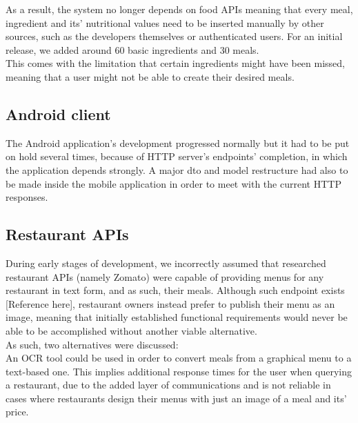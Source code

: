     As a result, the system no longer depends on food APIs meaning that every meal, ingredient and its' nutritional values
    need to be inserted manually by other sources, such as the developers themselves or authenticated users.
    For an initial release, we added around 60 basic ingredients and 30 meals.\\
    
    This comes with the limitation that certain ingredients might have been missed,
    meaning that a user might not be able to create their desired meals.

    \subsection{Android client}

    The Android application's development progressed normally but it had to be put on hold several times, because of HTTP server's endpoints' completion, in which the application
    depends strongly. A major dto and model restructure had also to be made inside the mobile application in order to meet with the current HTTP responses.\\

    \subsection{Restaurant APIs}

    During early stages of development, 
    we incorrectly assumed that researched restaurant APIs (namely Zomato) were capable 
    of providing menus for any restaurant in text form, and as such, their meals. Although such endpoint exists [Reference here], 
    restaurant owners instead prefer to publish their menu as an image, 
    meaning that initially established functional requirements would never be able to be accomplished without 
    another viable alternative.\\

    As such, two alternatives were discussed:\\

    An OCR tool could be used in order to convert meals from a graphical menu to a text-based one.
    This implies additional response times for the user when querying a restaurant, due to the added layer 
    of communications and is not reliable in cases where restaurants
    design their menus with just an image of a meal and its' price.

